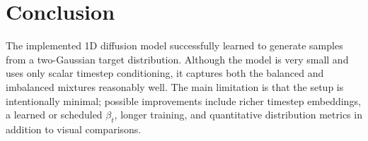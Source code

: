 \section{Conclusion}

The implemented 1D diffusion model successfully learned to generate samples from a two-Gaussian target distribution.
Although the model is very small and uses only scalar timestep conditioning, it captures both the balanced and imbalanced mixtures reasonably well.
The main limitation is that the setup is intentionally minimal; possible improvements include richer timestep embeddings, a learned or scheduled $\beta_t$, longer training, and quantitative distribution metrics in addition to visual comparisons.

\printbibliography


